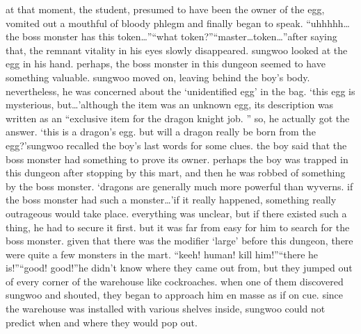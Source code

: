 at that moment, the student, presumed to have been the owner of the egg, vomited out a mouthful of bloody phlegm and finally began to speak.
“uhhhhh…the boss monster has this token…”“what token?”“master…token…”after saying that, the remnant vitality in his eyes slowly disappeared.
 sungwoo looked at the egg in his hand.
 perhaps, the boss monster in this dungeon seemed to have something valuable.
sungwoo moved on, leaving behind the boy’s body.
nevertheless, he was concerned about the ‘unidentified egg’ in the bag.
‘this egg is mysterious, but…’although the item was an unknown egg, its description was written as an “exclusive item for the dragon knight job.
” so, he actually got the answer.
‘this is a dragon’s egg.
 but will a dragon really be born from the egg?’sungwoo recalled the boy’s last words for some clues.
 the boy said that the boss monster had something to prove its owner.
 perhaps the boy was trapped in this dungeon after stopping by this mart, and then he was robbed of something by the boss monster.
‘dragons are generally much more powerful than wyverns.
 if the boss monster had such a monster…’if it really happened, something really outrageous would take place.
everything was unclear, but if there existed such a thing, he had to secure it first.
but it was far from easy for him to search for the boss monster.
 given that there was the modifier ‘large’ before this dungeon, there were quite a few monsters in the mart.
“keeh! human! kill him!”“there he is!”“good! good!”he didn’t know where they came out from, but they jumped out of every corner of the warehouse like cockroaches.
 when one of them discovered sungwoo and shouted, they began to approach him en masse as if on cue.
 since the warehouse was installed with various shelves inside, sungwoo could not predict when and where they would pop out.


 